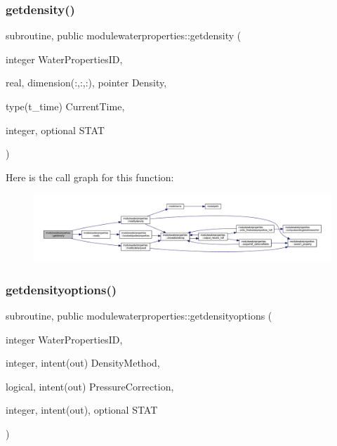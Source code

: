 \subsubsection{\texorpdfstring{getdensity()}{getdensity()}}
{\footnotesize\ttfamily subroutine, public modulewaterproperties\+::getdensity (\begin{DoxyParamCaption}\item[{integer}]{Water\+Properties\+ID,  }\item[{real, dimension(\+:,\+:,\+:), pointer}]{Density,  }\item[{type(t\+\_\+time)}]{Current\+Time,  }\item[{integer, optional}]{S\+T\+AT }\end{DoxyParamCaption})}

Here is the call graph for this function\+:\nopagebreak
\begin{figure}[H]
\begin{center}
\leavevmode
\includegraphics[width=350pt]{namespacemodulewaterproperties_a5d3bf3d9b122b9eee78afc56a4047507_cgraph}
\end{center}
\end{figure}
\mbox{\label{namespacemodulewaterproperties_ac9026fc793014229d0d9bed57148db6a}} 
\subsubsection{\texorpdfstring{getdensityoptions()}{getdensityoptions()}}
{\footnotesize\ttfamily subroutine, public modulewaterproperties\+::getdensityoptions (\begin{DoxyParamCaption}\item[{integer}]{Water\+Properties\+ID,  }\item[{integer, intent(out)}]{Density\+Method,  }\item[{logical, intent(out)}]{Pressure\+Correction,  }\item[{integer, intent(out), optional}]{S\+T\+AT }\end{DoxyParamCaption})}


